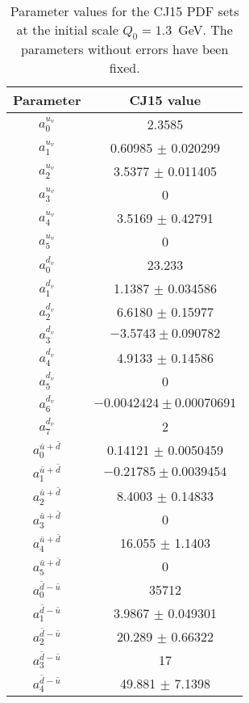 \documentclass[aps,prd,amsmath,preprint]{revtex4}
\begin{document}
\begin{table}[htb]
\begin{center}
\caption{Parameter values for the CJ15 PDF sets at the initial scale
	$Q_0 = 1.3$~GeV.  The parameters without errors have been
	fixed. \\}
{\scriptsize
\begin{tabular}{c|c}\hline
Parameter	& CJ15 value \\ \hline
%
$a_0^{u_v}$	& 2.3585                        \\
$a_1^{u_v}$	& 0.60985 $\pm$ 0.020299        \\
$a_2^{u_v}$	& 3.5377 $\pm$ 0.011405         \\
$a_3^{u_v}$	& 0                             \\
$a_4^{u_v}$	& 3.5169 $\pm$ 0.42791          \\
$a_5^{u_v}$	& 0				\\ \hline
%
$a_0^{d_v}$	& 23.233                        \\
$a_1^{d_v}$	& 1.1387 $\pm$ 0.034586         \\
$a_2^{d_v}$   	& 6.6180 $\pm$ 0.15977          \\
$a_3^{d_v}$ 	& $-3.5743 \pm 0.090782$        \\
$a_4^{d_v}$	& 4.9133 $\pm$ 0.14586          \\
$a_5^{d_v}$     & 0                             \\
$a_6^{d_v}$     & $-0.0042424 \pm 0.00070691$	\\
$a_7^{d_v}$     & 2                             \\ \hline
%
$a_0^{\bar u+\bar d}$ & 0.14121 $\pm$ 0.0050459 \\
$a_1^{\bar u+\bar d}$ & $-0.21785 \pm 0.0039454$\\
$a_2^{\bar u+\bar d}$ & 8.4003 $\pm$ 0.14833   	\\
$a_3^{\bar u+\bar d}$ & 0                       \\
$a_4^{\bar u+\bar d}$ & 16.055 $\pm$ 1.1403	\\
$a_5^{\bar u+\bar d}$ & 0			\\ \hline
%
$a_0^{\bar d-\bar u}$ & 35712			\\
$a_1^{\bar d-\bar u}$ & 3.9867 $\pm$ 0.049301	\\
$a_2^{\bar d-\bar u}$ & 20.289 $\pm$ 0.66322	\\    
$a_3^{\bar d-\bar u}$ & 17			\\
$a_4^{\bar d-\bar u}$ & 49.881 $\pm$ 7.1398	\\ \hline

\end{tabular}}
\end{center}
\end{table}
\end{document}

